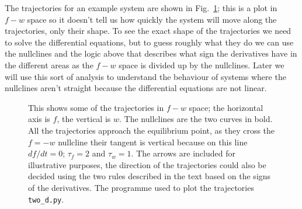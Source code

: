 \documentclass{article}
\begin{document}
The trajectories for an example system are shown in Fig.~\ref{two_d};
this is a plot in $f-w$ space so it doesn't tell us how quickly the
system will move along the trajectories, only their shape. To see the
exact shape of the trajectories we need to solve the differential
equations, but to guess roughly what they do we can use the nullclines
and the logic above that describes what sign the derivatives have in
the different areas as the $f-w$ space is divided up by the
nullclines. Later we will use this sort of analysis to understand the
behaviour of systems where the nullclines aren't straight because the
differential equations are not linear.


\begin{figure}[tb]
\begin{center}

\end{center}
\caption{This shows some of the trajectories in $f-w$ space; the
  horizontal axis is $f$, the vertical is $w$. The nullclines are the
  two curves in bold. All the trajectories approach the equilibrium
  point, as they cross the $f=-w$ nullcline their tangent is vertical
  because on this line $df/dt=0$; $\tau_f=2$ and $\tau_w=1$. The
  arrows are included for illustrative purposes, the direction of the
  trajectories could also be decided using the two rules described in
  the text based on the signs of the derivatives. The programme used
  to plot the trajectories \texttt{two\_d.py}. \label{two_d}}
\end{figure}
\end{document}
